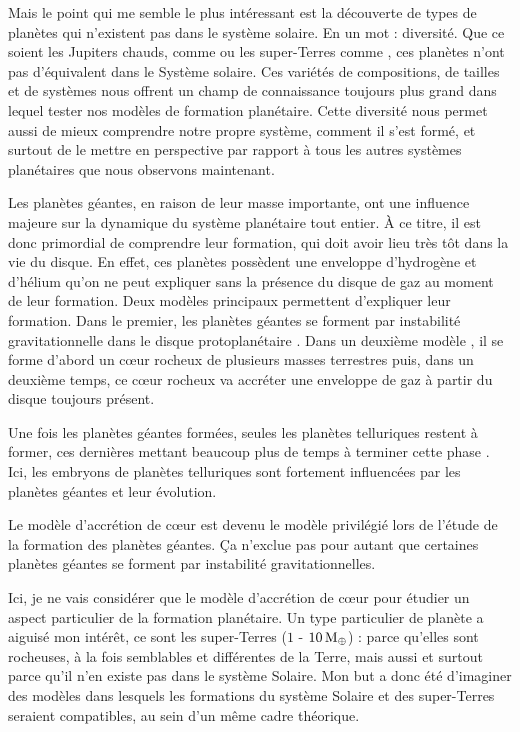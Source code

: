Mais le point qui me semble le plus intéressant est la découverte de types de planètes qui n'existent pas dans le système
solaire. En un mot : diversité. Que ce soient les Jupiters chauds, comme  ou les super-Terres comme
, ces planètes n'ont pas d'équivalent dans le Système solaire. Ces variétés de compositions, de tailles et de
systèmes nous offrent un champ de connaissance toujours plus grand dans lequel tester nos modèles de formation planétaire.
Cette diversité nous permet aussi de mieux comprendre notre propre système, comment il s'est formé, et surtout de le mettre
en perspective par rapport à tous les autres systèmes planétaires que nous observons maintenant.

Les planètes géantes, en raison de leur masse importante, ont une influence majeure sur la dynamique du système planétaire tout entier. À ce titre, il est donc primordial de comprendre leur formation, qui doit avoir lieu très tôt dans la vie du disque. En effet, ces planètes possèdent une enveloppe d'hydrogène et d'hélium qu'on ne peut expliquer sans la présence du disque de gaz au moment de leur formation. Deux modèles principaux permettent d'expliquer leur formation. Dans le premier, les planètes géantes se forment par instabilité gravitationnelle dans le disque protoplanétaire \citep{boss1997giant}. Dans un deuxième modèle \citep{pollack1996formation, alibert2004migration, levison2010modeling}, il se forme d'abord un cœur rocheux de plusieurs masses terrestres puis, dans un deuxième temps, ce cœur rocheux va accréter une enveloppe de gaz à partir du disque toujours présent. 

Une fois les planètes géantes formées, seules les planètes telluriques restent à former, ces dernières mettant beaucoup plus de temps à terminer cette phase \citep{morbidelli2012building}. Ici, les embryons de planètes telluriques sont fortement influencées par les planètes géantes et leur évolution. 

Le modèle d'accrétion de cœur est devenu le modèle privilégié lors de l'étude de la formation des planètes géantes. Ça n'exclue pas pour autant que certaines planètes géantes se forment par instabilité gravitationnelles. 

Ici, je ne vais considérer que le modèle d'accrétion de cœur pour étudier un aspect particulier de la formation planétaire. Un type particulier de planète a aiguisé mon intérêt, ce sont les super-Terres ($1$ - $10\mathrm{\thinspace M_\oplus}$) : parce
qu'elles sont rocheuses, à la fois semblables et différentes de la Terre, mais aussi et surtout parce qu'il n'en existe pas dans
le système Solaire. Mon but a donc été d'imaginer des modèles dans lesquels les formations du système Solaire et des
super-Terres seraient compatibles, au sein d'un même cadre théorique.


